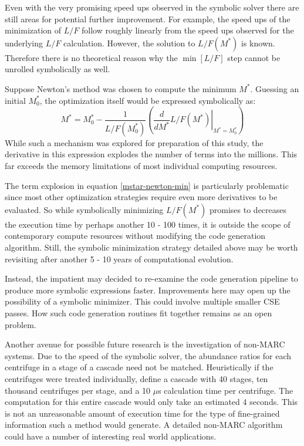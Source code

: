 \documentclass{ansconf}
\newcommand{\us}[0]{$\mu$s }
\begin{document}
Even with the very promising speed ups observed in the symbolic solver there are 
still areas for potential further improvement.  For example, the speed ups of the 
minimization of $L/F$ follow roughly linearly from the speed ups observed for the
underlying $L/F$ calculation.  However, the solution to $L/F(M^*)$ is known.
Therefore there is no theoretical reason why the $\min\left[L/F\right]$ step 
cannot be unrolled symbolically as well.

Suppose Newton's method was chosen to compute the minimum $M^*$.  Guessing 
an initial $M_0^*$, the optimization itself would be expressed symbolically as:
\begin{equation}
M^* = M_0^* - \frac{1}{L/F(M_0^*)}\left(\left.\frac{d}{dM^*}L/F(M^*)\right|_{M^*=M_0^*}\right)
\label{mstar-newton-min}
\end{equation}
While such a mechanism was explored for preparation of this study, the derivative
in this expression explodes the number of terms into the millions.  This far exceeds
the memory limitations of most individual computing resources.  

The term explosion in equation \ref{mstar-newton-min} is particularly problematic 
since most other optimization strategies require
even more derivatives to be evaluated.  So while symbolically minimizing $L/F(M^*)$
 promises
to decreases the execution time by perhaps another 10 - 100 times, it is 
outside the scope of contemporary compute resources without modifying the 
code generation algorithm.  Still, the symbolic minimization strategy detailed above
may be worth revisiting after another 5 - 10 years of computational evolution.

Instead, the impatient may decided to re-examine the code generation pipeline to 
produce more symbolic expressions faster.  Improvements here may open up the 
possibility of
a symbolic minimizer.  This could involve multiple smaller CSE passes.  How 
such code generation routines fit together remains as an open problem.

Another avenue for possible future research is the investigation of non-MARC 
systems.  Due to the speed of the symbolic solver, the abundance ratios for 
each centrifuge in a stage of a cascade need not be matched.  Heuristically
if the centrifuges were treated individually, define a cascade with 40 stages, 
ten thousand centrifuges per stage, and a 10 \us calculation time per centrifuge. 
The computation for this entire
cascade would only take an estimated 4 seconds.  This is not an unreasonable 
amount of execution time for the type of fine-grained information such a 
method would generate.  A detailed non-MARC algorithm could have a number of
interesting real world applications.
\end{document}
